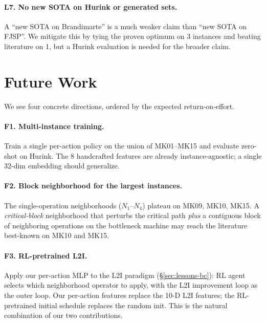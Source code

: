 \documentclass[10pt]{article}
\theoremstyle{definition}
\begin{document}
\paragraph{L7. No new SOTA on Hurink or generated sets.}
A ``new SOTA on Brandimarte'' is a much weaker claim than
``new SOTA on FJSP''. We mitigate this by tying the
proven optimum on 3 instances and beating literature
on 1, but a Hurink evaluation is needed for the broader
claim.

\section{Future Work}
\label{sec:future}

We see four concrete directions, ordered by the expected
return-on-effort.

\paragraph{F1. Multi-instance training.} Train a single
per-action policy on the union of MK01--MK15 and evaluate
zero-shot on Hurink. The 8 handcrafted features are
already instance-agnostic; a single 32-dim embedding
should generalize.

\paragraph{F2. Block neighborhood for the largest
instances.} The single-operation neighborhoods
($N_1$--$N_4$) plateau on MK09, MK10, MK15. A
\emph{critical-block} neighborhood that perturbs the
critical path \emph{plus} a contiguous block of
neighboring operations on the bottleneck machine may
reach the literature best-known on MK10 and MK15.

\paragraph{F3. RL-pretrained L2I.}
Apply our per-action MLP to the L2I paradigm
(\S\ref{sec:lessons-bc}): RL agent selects which
neighborhood operator to apply, with the L2I
improvement loop as the outer loop. Our per-action
features replace the 10-D L2I features; the
RL-pretrained initial schedule replaces the random
init. This is the natural combination of our two
contributions.
\end{document}
